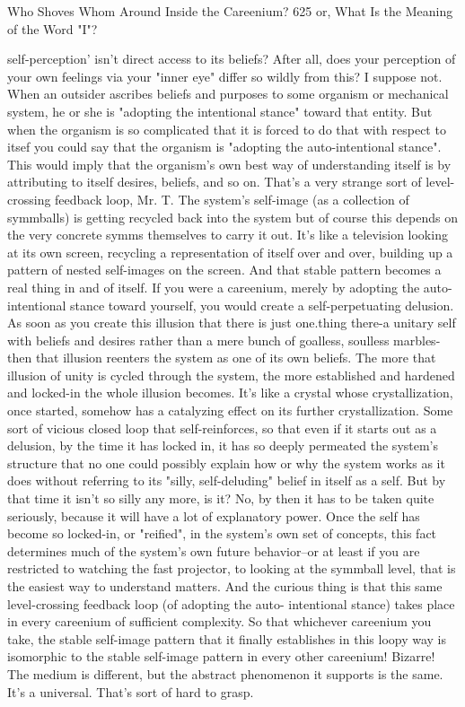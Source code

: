 Who Shoves Whom Around Inside the Careenium?                                          625
or, What Is the Meaning of the Word "I"?

  self-perception' isn't direct access to its beliefs? After all, does your perception of
  your own feelings via your "inner eye" differ so wildly from this?
\achilles I suppose not.
\tortoise When an outsider ascribes beliefs and purposes to some organism or
  mechanical system, he or she is "adopting the intentional stance" toward that
  entity. But when the organism is so complicated that it is forced to do that with
  respect to itsef you could say that the organism is "adopting the auto-intentional
  stance". This would imply that the organism's own best way of understanding itself
  is by attributing to itself desires, beliefs, and so on.
\achilles That's a very strange sort of level-crossing feedback loop, Mr. T. The
  system's self-image (as a collection of symmballs) is getting recycled back into the
  system but of course this depends on the very concrete symms themselves to carry
  it out. It's like a television looking at its own screen, recycling a representation of
  itself over and over, building up a pattern of nested self-images on the screen.
\tortoise And that stable pattern becomes a real thing in and of itself. If you were
  a careenium, merely by adopting the auto-intentional stance toward yourself, you
  would create a self-perpetuating delusion. As soon as you create this illusion that
  there is just one.thing there-a unitary self with beliefs and desires rather than a
  mere bunch of goalless, soulless marbles-then that illusion reenters the system as
  one of its own beliefs. The more that illusion of unity is cycled through the system,
  the more established and hardened and locked-in the whole illusion becomes. It's
  like a crystal whose crystallization, once started, somehow has a catalyzing effect
  on its further crystallization. Some sort of vicious closed loop that self-reinforces,
  so that even if it starts out as a delusion, by the time it has locked in, it has so
  deeply permeated the system's structure that no one could possibly explain how or
  why the system works as it does without referring to its "silly, self-deluding" belief
  in itself as a self.
\achilles But by that time it isn't so silly any more, is it?
\tortoise No, by then it has to be taken quite seriously, because it will have a lot
  of explanatory power. Once the self has become so locked-in, or "reified", in the
  system's own set of concepts, this fact determines much of the system's own future
  behavior--or at least if you are restricted to watching the fast projector, to looking
  at the symmball level, that is the easiest way to understand matters. And the
  curious thing is that this same level-crossing feedback loop (of adopting the auto-
  intentional stance) takes place in every careenium of sufficient complexity. So that
  whichever careenium you take, the stable self-image pattern that it finally
  establishes in this loopy way is isomorphic to the stable self-image pattern in every
  other careenium!
\achilles Bizarre! The medium is different, but the abstract phenomenon it
  supports is the same. It's a universal. That's sort of hard to grasp.




